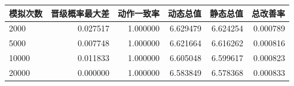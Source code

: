 \begin{tabular}{lrrrrr}
\toprule
模拟次数 & 晋级概率最大差 & 动作一致率 & 动态总值 & 静态总值 & 总改善率 \\
\midrule
2000 & 0.027517 & 1.000000 & 6.629479 & 6.624254 & 0.000789 \\
5000 & 0.007748 & 1.000000 & 6.621664 & 6.616262 & 0.000816 \\
10000 & 0.011833 & 1.000000 & 6.605048 & 6.599617 & 0.000823 \\
20000 & 0.000000 & 1.000000 & 6.583849 & 6.578368 & 0.000833 \\
\bottomrule
\end{tabular}
